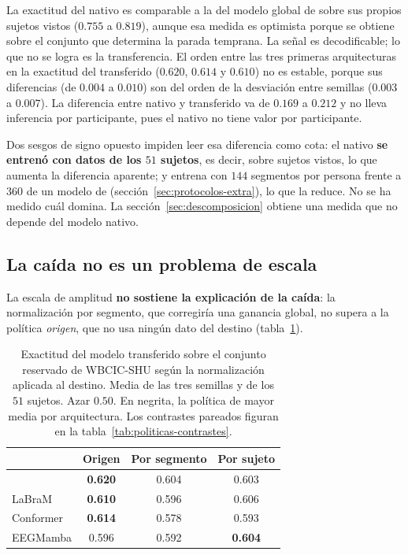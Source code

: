 La exactitud del nativo es comparable a la del modelo global de \openbmi{} sobre sus propios sujetos vistos
($0.755$ a $0.819$), aunque esa medida es optimista porque se obtiene sobre el conjunto que determina la
parada temprana. La señal es decodificable; lo que no se logra es la transferencia. El orden entre las tres
primeras arquitecturas en la exactitud del transferido ($0.620$, $0.614$ y $0.610$) no es estable, porque sus
diferencias (de $0.004$ a $0.010$) son del orden de la desviación entre semillas ($0.003$ a $0.007$). La
diferencia entre nativo y transferido va de $0.169$ a $0.212$ y no lleva inferencia por participante, pues el
nativo no tiene valor por participante.

Dos sesgos de signo opuesto impiden leer esa diferencia como cota: el nativo \textbf{se entrenó con datos de
los $51$ sujetos}, es decir, sobre sujetos vistos, lo que aumenta la diferencia aparente; y entrena con $144$
segmentos por persona frente a $360$ de un modelo de \openbmi{}
(sección~\ref{sec:protocolos-extra}), lo que la reduce. No se ha medido cuál domina. La
sección~\ref{sec:descomposicion} obtiene una medida que no depende del modelo nativo.

\subsection{La caída no es un problema de escala}

La escala de amplitud \textbf{no sostiene la explicación de la caída}: la normalización por segmento, que
corregiría una ganancia global, no supera a la política \emph{origen}, que no usa ningún dato del destino
(tabla~\ref{tab:politicas}).

\begin{table}[H]
\centering
\caption{Exactitud del modelo transferido sobre el conjunto reservado de WBCIC-SHU según la
normalización aplicada al destino. Media de las tres semillas y de los $51$ sujetos. Azar
$0.50$. En negrita, la política de mayor media por arquitectura. Los contrastes pareados figuran
en la tabla~\ref{tab:politicas-contrastes}.}
\label{tab:politicas}
\small
\begin{tabular}{lccc}
\toprule
 & \textbf{Origen} & \textbf{Por segmento} & \textbf{Por sujeto} \\
\midrule
\eegnet{} & \textbf{0.620} & 0.604 & 0.603 \\
LaBraM & \textbf{0.610} & 0.596 & 0.606 \\
Conformer & \textbf{0.614} & 0.578 & 0.593 \\
EEGMamba & 0.596 & 0.592 & \textbf{0.604} \\
\bottomrule
\end{tabular}
\end{table}

